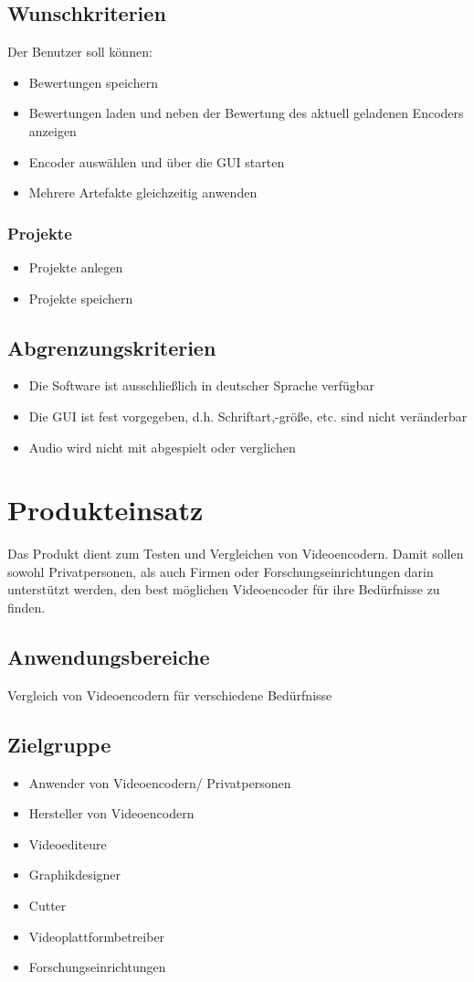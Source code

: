 \documentclass[parskip=full]{scrartcl}
\begin{document}
\subsection{Wunschkriterien}
Der Benutzer soll können:
\begin{itemize}
\item Bewertungen speichern
\item Bewertungen laden und neben der Bewertung des aktuell geladenen Encoders anzeigen
\item Encoder auswählen und über die GUI starten
\item Mehrere Artefakte gleichzeitig anwenden
\end{itemize}
\subsubsection{Projekte}
\begin{itemize}
\item Projekte anlegen
\item Projekte speichern
\end{itemize}
\subsection{Abgrenzungskriterien}
\begin{itemize}
\item Die Software ist ausschließlich in deutscher Sprache verfügbar
\item Die GUI ist fest vorgegeben, d.h. Schriftart,-größe, etc. sind nicht veränderbar
\item Audio wird nicht mit abgespielt oder verglichen
\end{itemize}
\newpage
\section{Produkteinsatz}
Das Produkt dient zum Testen und Vergleichen von Videoencodern. 
Damit sollen sowohl Privatpersonen, als auch Firmen oder Forschungseinrichtungen darin unterstützt werden, den best möglichen Videoencoder für ihre Bedürfnisse zu finden.
\subsection{Anwendungsbereiche}
Vergleich von Videoencodern für verschiedene Bedürfnisse
\subsection{Zielgruppe}
\begin{itemize}
\item Anwender von Videoencodern/ Privatpersonen
\item Hersteller von Videoencodern
\item Videoediteure
\item Graphikdesigner
\item Cutter
\item Videoplattformbetreiber
\item Forschungseinrichtungen
\end{itemize}
\end{document}
